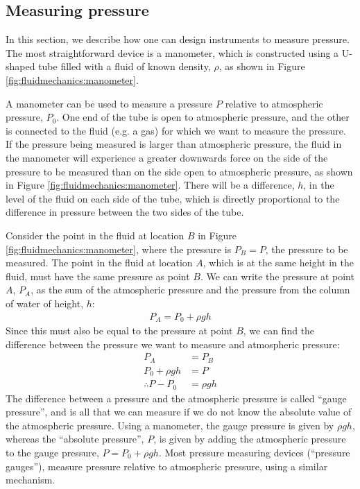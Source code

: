 \subsection{Measuring pressure}
In this section, we describe how one can design instruments to measure pressure. The most straightforward device is a manometer, which is constructed using a U-shaped tube filled with a fluid of known density, $\rho$, as shown in Figure \ref{fig:fluidmechanics:manometer}.
{
A manometer can be used to measure a pressure $P$ relative to atmospheric pressure, $P_0$. One end of the tube is open to atmospheric pressure, and the other is connected to the fluid (e.g. a gas) for which we want to measure the pressure. If the pressure being measured is larger than atmospheric pressure, the fluid in the manometer will experience a greater downwards force on the side of the pressure to be measured than on the side open to atmospheric pressure, as shown in Figure \ref{fig:fluidmechanics:manometer}. There will be a difference, $h$, in the level of the fluid on each side of the tube, which is directly proportional to the difference in pressure between the two sides of the tube.

Consider the point in the fluid at location $B$ in Figure \ref{fig:fluidmechanics:manometer}, where the pressure is $P_B=P$, the pressure to be measured. The point in the fluid at location $A$, which is at the same height in the fluid, must have the same pressure as point $B$. We can write the pressure at point $A$, $P_A$, as the sum of the atmospheric pressure and the pressure from the column of water of height, $h$:
\begin{align*}
P_A=P_0+\rho g h
\end{align*}
Since this must also be equal to the pressure at point $B$, we can find the difference between the pressure we want to measure and atmospheric pressure:
\begin{align*}
P_A &= P_B \\
P_0+\rho g h &= P\\
\therefore P - P_0 &= \rho g h 
\end{align*}
The difference between a pressure and the atmospheric pressure is called ``gauge pressure'', and is all that we can measure if we do not know the absolute value of the atmospheric pressure. Using a manometer, the gauge pressure is given by $\rho g h$, whereas the ``absolute pressure'', $P$, is given by adding the atmospheric pressure to the gauge pressure, $P = P_0 + \rho g h$. Most pressure measuring devices (``pressure gauges''), measure pressure relative to atmospheric pressure, using a similar mechanism. 

}
